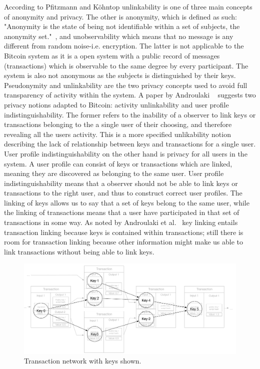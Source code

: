 According to Pfitzmann and Köhntop unlinkability is one of three main concepts of anonymity and privacy. The other is anonymity, which is defined as such: "Anonymity is the state of being not identifiable within a set of subjects, the anonymity set."~\cite{pfitzmann2001anonymity}, and unobservability which means that no message is any different from random noise-i.e. encryption. The latter is not applicable to the Bitcoin system as it is a open system with a public record of messages (transactions) which is observable to the same degree by every participant. The system is also not anonymous as the subjects is distinguished by their keys.
\\

Pseudonymity and unlinkability are the two privacy concepts used to avoid full transparency of activity within the system. A paper by Androulaki ~\cite{androulaki2013evaluating} suggests two privacy notions adapted to Bitcoin: activity unlinkability and user profile indistinguishability. The former refers to the inability of a observer to link keys or transactions belonging to the a single user of their choosing, and therefore revealing all the users activity. This is a more specified unlikability notion describing the lack of relationship between keys and transactions for a single user. User profile indistinguishability on the other hand is privacy for all users in the system. A user profile can consist of keys or transactions which are linked, meaning they are discovered as belonging to the same user. User profile indistinguishability means that a observer should not be able to link keys or transactions to the right user, and thus to construct correct user profiles. The linking of keys allows us to say that a set of keys belong to the same user, while the linking of transactions means that a user have participated in that set of transactions in some way. As noted by Androulaki et al.~\cite{androulaki2013evaluating} key linking entails transaction linking because keys is contained within transactions; still there is room for transaction linking because other information might make us able to link transactions without being able to link keys. 

\begin{figure}[ht]
    \centering
    \includegraphics[width=14cm]{figures/key_network_related.png}
    \caption{ Transaction network with keys shown.}
    \label{fig:transaction_graph_keys}
\end{figure}

